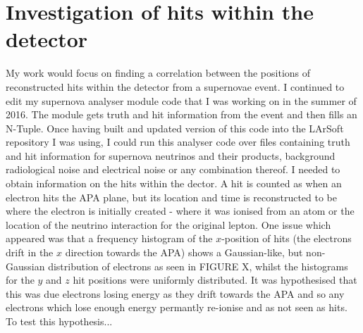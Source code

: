 \documentclass[a4paper,12,oneside,notitlepage]{report}
\begin{document}
\section*{\fontsize{11}{11}\selectfont Investigation of hits within the detector}
My work would focus on finding a correlation between the positions of reconstructed hits within the detector from a supernovae event. I continued to edit my supernova analyser module code that I was working on in the summer of 2016. The module gets truth and hit information from the event and then fills an N-Tuple. Once having built and updated version of this code into the LArSoft repository I was using, I could run this analyser code over files containing truth and hit information for supernova neutrinos and their products, background radiological noise and electrical noise or any combination thereof. 
\vspace{0.5cm}
I needed to obtain information on the hits within the dector. A hit is counted as when an electron hits the APA plane, but its location and time is reconstructed to be where the electron is initially created - where it was ionised from an atom or the location of the neutrino interaction for the original lepton. One issue which appeared was that a frequency histogram of the $x$-position of hits (the electrons drift in the $x$ direction towards the APA) shows a Gaussian-like, but non-Gaussian distribution of electrons as seen in FIGURE X, whilst the histograms for the $y$ and $z$ hit positions were uniformly distributed. It was hypothesised that this was due electrons losing energy as they drift towards the APA and so any electrons which lose enough energy permantly re-ionise and as not seen as hits. To test this hypothesis...
\end{document}
